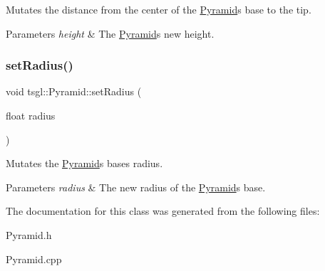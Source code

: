 Mutates the distance from the center of the \hyperlink{classtsgl_1_1_pyramid}{Pyramid}\textquotesingle{}s base to the tip. 


\begin{DoxyParams}{Parameters}
{\em height} & The \hyperlink{classtsgl_1_1_pyramid}{Pyramid}\textquotesingle{}s new height. \\
\hline
\end{DoxyParams}
\mbox{\label{classtsgl_1_1_pyramid_ac949cacc0db5fb112d92e2ec987cd5c3}} 
\subsubsection{\texorpdfstring{set\+Radius()}{setRadius()}}
{\footnotesize\ttfamily void tsgl\+::\+Pyramid\+::set\+Radius (\begin{DoxyParamCaption}\item[{float}]{radius }\end{DoxyParamCaption})\hspace{0.3cm}{\ttfamily [virtual]}}



Mutates the \hyperlink{classtsgl_1_1_pyramid}{Pyramid}\textquotesingle{}s base\textquotesingle{}s radius. 


\begin{DoxyParams}{Parameters}
{\em radius} & The new radius of the \hyperlink{classtsgl_1_1_pyramid}{Pyramid}\textquotesingle{}s base. \\
\hline
\end{DoxyParams}


The documentation for this class was generated from the following files\+:\begin{DoxyCompactItemize}
\item 
Pyramid.\+h\item 
Pyramid.\+cpp\end{DoxyCompactItemize}
